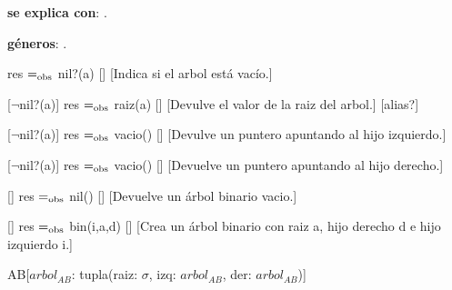 \begin{Interfaz}
  
  
  \textbf{se explica con}: .
  
  \textbf{g\'eneros}: .


  {res $=_{\mathrm{obs}}$ nil?(a)}
  []
  [Indica si el arbol est\'a vac\'io.]

  [$\neg$nil?(a)]
  {res $=_{\mathrm{obs}}$ raiz(a)}
  []
  [Devulve el valor de la raiz del arbol.]
  [alias?]
  
  [$\neg$nil?(a)]  
  {res $=_{\mathrm{obs}}$ vacio()}
  []
  [Devulve un puntero apuntando al hijo izquierdo.]
  
  [$\neg$nil?(a)]  
  {res $=_{\mathrm{obs}}$ vacio()}
  []
  [Devuelve un puntero apuntando al hijo derecho.]
  
  []
  {res $=_{\mathrm{obs}}$ nil()}
  []
  [Devuelve un \'arbol binario vacio.]
  
  []
  {res $=_{\mathrm{obs}}$ bin(i,a,d)}
  []
  [Crea un \'arbol binario con raiz a, hijo derecho d e hijo izquierdo i.]

\end{Interfaz}

\newpage 

\begin{Representacion}

\begin{Estructura}{AB}[$arbol_{AB}$: tupla(raiz: $\sigma$, izq: $arbol_{AB}$, der: $arbol_{AB}$)]
   
\end{Estructura}

\end{Representacion}

